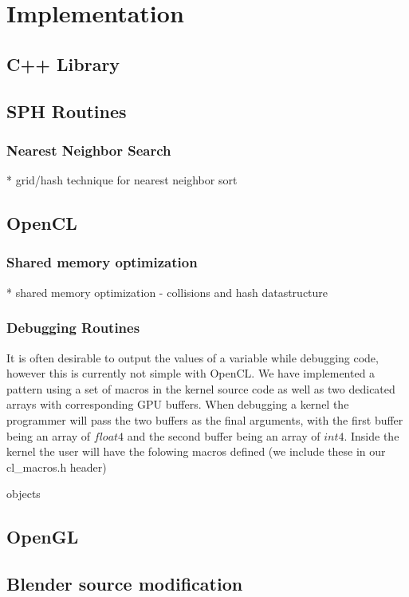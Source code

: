 \chapter{Implementation}

\section{C++ Library}



\section{SPH Routines}
\subsection{Nearest Neighbor Search}
* grid/hash technique for nearest neighbor sort


\section{OpenCL}
\subsection{Shared memory optimization}
* shared memory optimization - collisions and hash datastructure 


\subsection{Debugging Routines}

It is often desirable to output the values of a variable while debugging code,
however this is currently not simple with OpenCL. We have implemented a pattern
using a set of macros in the kernel source code as well as two dedicated arrays
with corresponding GPU buffers. When debugging a kernel the programmer will
pass the two buffers as the final arguments, with the first buffer being an array of $float4$ and the second buffer being an array of $int4$. Inside the kernel the user will have the folowing macros defined (we include these in our cl\_macros.h header)
\begin{cppcode}[0]
objects 
\end{cppcode}



\section{OpenGL}
\section{Blender source modification}



